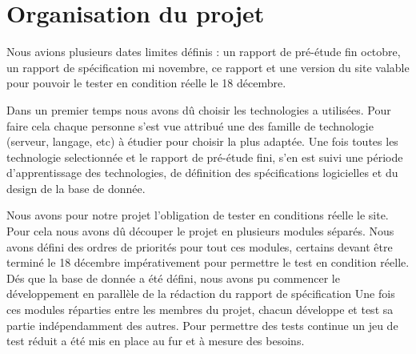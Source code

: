 \chapter{Organisation du projet}

Nous avions plusieurs dates limites définis : un rapport de pré-étude fin octobre, un rapport de spécification mi novembre, ce rapport et une version du site valable pour pouvoir le tester en condition réelle le 18 décembre.

Dans un premier temps nous avons dû choisir les technologies a utilisées. Pour faire cela chaque personne s'est vue attribué une des famille de technologie (serveur, langage, etc) à étudier pour choisir la plus adaptée.
Une fois toutes les technologie selectionnée et le rapport de pré-étude fini, s'en est suivi une période d'apprentissage des technologies, de définition des spécifications logicielles et du design de  la base de donnée.

Nous avons pour notre projet l'obligation de tester en conditions réelle le site. Pour cela nous avons dû découper le projet en plusieurs modules séparés. Nous avons défini des ordres de priorités pour tout ces modules, certains devant être terminé le 18 décembre impérativement pour permettre le test en condition réelle.
Dés que la base de donnée a été défini, nous avons pu commencer le développement en parallèle de la rédaction du rapport de spécification
Une fois ces modules réparties entre les membres du projet, chacun développe et test sa partie indépendamment des autres.
Pour permettre des tests continue un jeu de test réduit a été mis en place au fur et à mesure des besoins.
